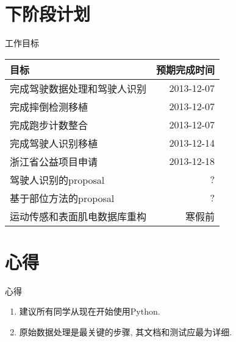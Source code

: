 \documentclass[compress]{beamer}
\newcommand{\ra}[1]{\renewcommand{\arraystretch}{#1}}
\begin{document}
\section{下阶段计划}

\begin{frame}{工作目标}
    \begin{center}
        \ra{1.3}
        \begin{tabu} to \textwidth {lR}
            \toprule
            目标 & 预期完成时间 \\
            \midrule
            完成驾驶数据处理和驾驶人识别 & 2013-12-07 \\
            完成摔倒检测移植 & 2013-12-07 \\
            完成跑步计数整合 & 2013-12-07 \\
            完成驾驶人识别移植 & 2013-12-14 \\
            浙江省公益项目申请 & 2013-12-18 \\
            驾驶人识别的proposal & ? \\
            基于部位方法的proposal & ? \\
            运动传感和表面肌电数据库重构 & 寒假前 \\
            \bottomrule
        \end{tabu}
    \end{center}
\end{frame}

\section{心得}

\begin{frame}{心得}
    \begin{enumerate}[1)]
        \item 建议所有同学从现在开始使用Python.
        \item 原始数据处理是最关键的步骤, 其文档和测试应最为详细.
    \end{enumerate}
\end{frame}
\end{document}
